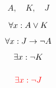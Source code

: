 % 
% 
% 

\begin{frame}{}
  \[
    A,\quad K,\quad J
  \]

  \begin{gather*}
    \setcounter{equation}{0}
    \forall x: A \lor K \\[1ex]
    \forall x: J \to \lnot A \\[1ex]
    \exists x: \lnot K \\[3ex]
    \red{\exists x: \lnot J}
  \end{gather*}
\end{frame}
